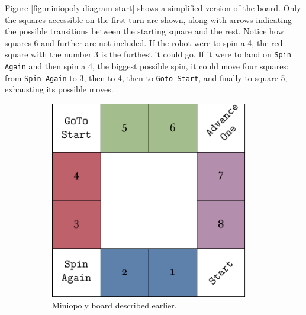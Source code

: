 Figure \ref{fig:miniopoly-diagram-start} shows a simplified version of the
board. Only the squares accessible on the first turn are shown, along with
arrows indicating the possible transitions between the starting square and the
rest. Notice how squares 6 and further are not included. If the robot were to
spin a 4, the red square with the number 3 is the furthest it could go. If it
were to land on \texttt{Spin Again} and then spin a 4, the biggest possible
spin, it could move four squares: from \texttt{Spin Again} to 3, then to 4, then
to \texttt{Goto Start}, and finally to square 5, exhausting its possible moves.

\begin{figure}[h]
    \centering
	\begin{subfigure}[t]{0.35\textwidth}
		\centering
		\includegraphics[width=0.95\textwidth]{img/board.pdf}
		\caption{Miniopoly board described earlier.}
		\label{fig:miniopoly-board}
	\end{subfigure}
	\begin{subfigure}[t]{0.55\textwidth}
		\centering

\end{subfigure}
\end{figure}
